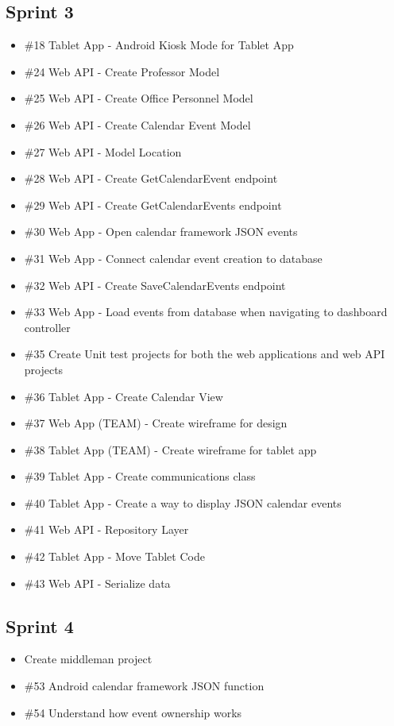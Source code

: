 \subsection*{Sprint 3}
\begin{itemize}
\item \#18 Tablet App - Android Kiosk Mode for Tablet App
\item \#24 Web API - Create Professor Model
\item \#25 Web API - Create Office Personnel Model
\item \#26 Web API - Create Calendar Event Model
\item \#27 Web API - Model Location
\item \#28 Web API - Create GetCalendarEvent endpoint
\item \#29 Web API - Create GetCalendarEvents endpoint
\item \#30 Web App - Open calendar framework JSON events
\item \#31 Web App - Connect calendar event creation to database
\item \#32 Web API - Create SaveCalendarEvents endpoint
\item \#33 Web App - Load events from database when navigating to dashboard controller
\item \#35 Create Unit test projects for both the web applications and web API projects
\item \#36 Tablet App - Create Calendar View
\item \#37 Web App (TEAM) - Create wireframe for design
\item \#38 Tablet App (TEAM) - Create wireframe for tablet app
\item \#39 Tablet App - Create communications class
\item \#40 Tablet App - Create a way to display JSON calendar events
\item \#41 Web API - Repository Layer
\item \#42 Tablet App - Move Tablet Code
\item \#43 Web API - Serialize data
\end{itemize}

\subsection*{Sprint 4}
\begin{itemize}
\item Create middleman project
\item \#53 Android calendar framework JSON function
\item \#54 Understand how event ownership works
\end{itemize}

